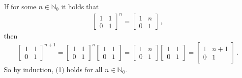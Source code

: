 \documentclass{article}
\begin{document}
If for some $n \in \mathbb{N}_0$ it holds that
\begin{align}
    \begin{bmatrix}
        1&1\\
        0&1
    \end{bmatrix}^n = \begin{bmatrix}
        1&n\\
        0&1
    \end{bmatrix} \,,
\end{align} then
\begin{align*}
    \begin{bmatrix}
        1&1\\
        0&1
    \end{bmatrix}^{n+1} = \begin{bmatrix}
        1&1\\
        0&1
    \end{bmatrix}^n \begin{bmatrix}
        1&1\\
        0&1
    \end{bmatrix} = \begin{bmatrix}
        1&n\\0&1
    \end{bmatrix} \begin{bmatrix}
        1&1\\0&1
    \end{bmatrix} = \begin{bmatrix}
        1&n+1\\
        0&1
    \end{bmatrix}\,.
\end{align*}
So by induction, (1) holds for all $n \in \mathbb{N}_0$.
\end{document}
